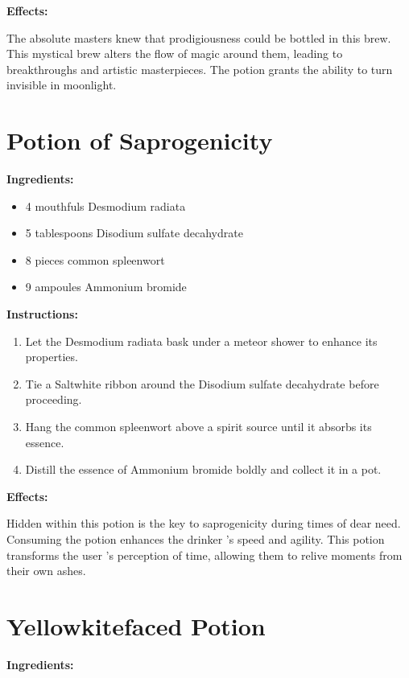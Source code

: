 \documentclass{article}
\begin{document}
\textbf{Effects:}

The absolute masters knew that prodigiousness could be bottled in this brew. This mystical brew alters the flow of magic around them, leading to breakthroughs and artistic masterpieces. The potion grants the ability to turn invisible in moonlight.

\newpage
\section*{Potion of Saprogenicity}

\textbf{Ingredients:}

\begin{itemize}
  \item 4 mouthfuls Desmodium radiata
  \item 5 tablespoons Disodium sulfate decahydrate
  \item 8 pieces common spleenwort
  \item 9 ampoules Ammonium bromide
\end{itemize}

\textbf{Instructions:}

\begin{enumerate}
  \item Let the Desmodium radiata bask under a meteor shower to enhance its properties.
  \item Tie a Saltwhite ribbon around the Disodium sulfate decahydrate before proceeding.
  \item Hang the common spleenwort above a spirit source until it absorbs its essence.
  \item Distill the essence of Ammonium bromide boldly and collect it in a pot.
\end{enumerate}

\textbf{Effects:}

Hidden within this potion is the key to saprogenicity during times of dear need. Consuming the potion enhances the drinker 's speed and agility. This potion transforms the user 's perception of time, allowing them to relive moments from their own ashes.

\newpage
\section*{Yellowkitefaced Potion}

\textbf{Ingredients:}
\end{document}
